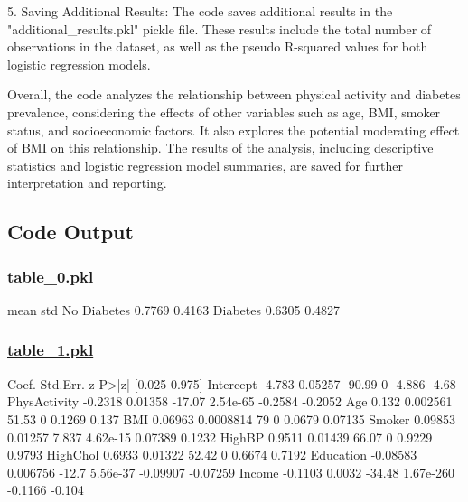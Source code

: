 \documentclass[11pt]{article}
\begin{document}
5. Saving Additional Results:
   The code saves additional results in the "additional\_results.pkl" pickle file. These results include the total number of observations in the dataset, as well as the pseudo R-squared values for both logistic regression models.

Overall, the code analyzes the relationship between physical activity and diabetes prevalence, considering the effects of other variables such as age, BMI, smoker status, and socioeconomic factors. It also explores the potential moderating effect of BMI on this relationship. The results of the analysis, including descriptive statistics and logistic regression model summaries, are saved for further interpretation and reporting.

\subsection{Code Output}\hypertarget{file-table-0-pkl}{}

\subsubsection*{\hyperlink{code-Data Analysis-table-0-pkl}{table\_0.pkl}}

\begin{codeoutput}
              mean    std
No Diabetes 0.7769 0.4163
Diabetes    0.6305 0.4827
\end{codeoutput}\hypertarget{file-table-1-pkl}{}

\subsubsection*{\hyperlink{code-Data Analysis-table-1-pkl}{table\_1.pkl}}

\begin{codeoutput}
                Coef.  Std.Err.      z      P>|z|   [0.025   0.975]
Intercept      -4.783   0.05257 -90.99          0   -4.886    -4.68
PhysActivity  -0.2318   0.01358 -17.07   2.54e-65  -0.2584  -0.2052
Age             0.132  0.002561  51.53          0   0.1269    0.137
BMI           0.06963 0.0008814     79          0   0.0679  0.07135
Smoker        0.09853   0.01257  7.837   4.62e-15  0.07389   0.1232
HighBP         0.9511   0.01439  66.07          0   0.9229   0.9793
HighChol       0.6933   0.01322  52.42          0   0.6674   0.7192
Education    -0.08583  0.006756  -12.7   5.56e-37 -0.09907 -0.07259
Income        -0.1103    0.0032 -34.48  1.67e-260  -0.1166   -0.104
\end{codeoutput}\hypertarget{file-table-2-pkl}{}
\end{document}
